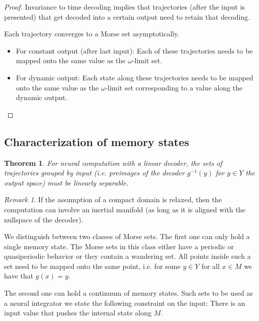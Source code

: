 \documentclass{scrartcl}
\newtheorem{theorem}{Theorem}
\theoremstyle{definition}
\theoremstyle{remark}
\newtheorem{remark}{Remark}
\begin{document}
\begin{proof}
Invariance to time decoding implies that trajectories (after the input is presented) that get decoded into a certain output need to retain that decoding.

Each trajectory converges to a Morse set asymptotically.

\begin{itemize}
\item For constant output (after last input): Each of these trajectories needs to be mapped onto the same value as the $\omega$-limit set.
\item For dynamic output: Each state along these trajectories needs to be mapped onto the same value as the $\omega$-limit set corresponding to a value along the dynamic output. %
\end{itemize}
\end{proof}


\subsection{Characterization of memory states}

\begin{theorem}
For neural computation with a linear decoder, the sets of trajectories grouped by input (i.e. preimages of the decoder $g^{-1}(y)$ for $y\in Y$ the output space) must be linearly separable.
\end{theorem}

\begin{remark}
If the assumption of a compact domain is relaxed, then the computation can involve an inertial manifold (as long as it is aligned with the nullspace of the decoder).
\end{remark}

We distinguish between two classes of Morse sets.
The first one can only hold a single memory state. 
The Morse sets in this class either have a periodic or quasiperiodic behavior or they contain a wandering set.
All points inside such a set need to be mapped onto the same point, i.e. for some $y\in Y$ for all $x\in M$ we have that $g(x)=y$.

The second one can hold a continuum of memory states. %
Such sets to be used as a neural integrator we state the following constraint on the input:
There is an input value that pushes the internal state along $M$.
\end{document}
